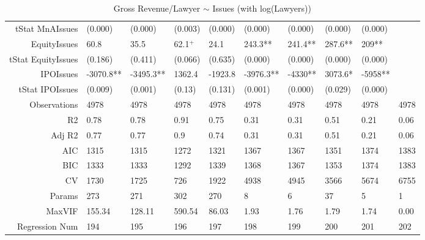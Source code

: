 \begin{table}[ht]
\begin{tabular}{rlllllllll}
  tStat MnAIssues & (0.000) & (0.000) & (0.003) & (0.000) & (0.000) & (0.000) & (0.000) & (0.000) &  \\ 
  EquityIssues & 60.8 & 35.5 & 62.1$^{+}$ & 24.1 & 243.3** & 241.4** & 287.6** & 209** &  \\ 
  tStat EquityIssues & (0.186) & (0.411) & (0.066) & (0.635) & (0.000) & (0.000) & (0.000) & (0.000) &  \\ 
  IPOIssues & -3070.8** & -3495.3** & 1362.4 & -1923.8 & -3976.3** & -4330** & 3073.6* & -5958** &  \\ 
  tStat IPOIssues & (0.009) & (0.001) & (0.13) & (0.131) & (0.001) & (0.000) & (0.029) & (0.000) &  \\ 
  Observations & 4978 & 4978 & 4978 & 4978 & 4978 & 4978 & 4978 & 4978 & 4978 \\ 
  R2 & 0.78 & 0.78 & 0.91 & 0.75 & 0.31 & 0.31 & 0.51 & 0.21 & 0.06 \\ 
  Adj R2 & 0.77 & 0.77 & 0.9 & 0.74 & 0.31 & 0.31 & 0.51 & 0.21 & 0.06 \\ 
  AIC & 1315 & 1315 & 1272 & 1321 & 1367 & 1367 & 1351 & 1374 & 1383 \\ 
  BIC & 1333 & 1333 & 1292 & 1339 & 1368 & 1367 & 1353 & 1374 & 1383 \\ 
  CV & 1730 & 1725 & 726 & 1922 & 4938 & 4945 & 3566 & 5674 & 6755 \\ 
  Params & 273 & 271 & 302 & 270 & 8 & 6 & 37 & 5 & 1 \\ 
  MaxVIF & 155.34 & 128.11 & 590.54 & 86.03 & 1.93 & 1.76 & 1.79 & 1.74 & 0.00 \\ 
  Regression Num & 194 & 195 & 196 & 197 & 198 & 199 & 200 & 201 & 202 \\ 
   \hline
\end{tabular}
\caption{Gross Revenue/Lawyer $\sim$ Issues (with log(Lawyers))} 
\end{table}
